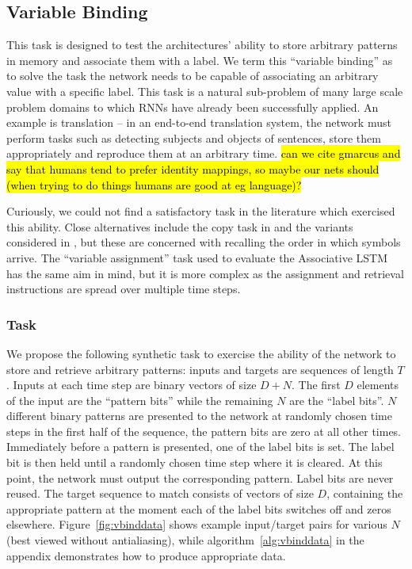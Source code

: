 \subsection{Variable Binding}
This task is designed to test the architectures' ability to store arbitrary patterns in memory and
associate them with a label. We term this ``variable binding'' as to solve the task the network needs
to be capable of associating an arbitrary value with a specific label. This task is a natural
sub-problem of many large scale problem domains to which RNNs have already been successfully applied.
An example is translation -- in an end-to-end translation system, the network must perform tasks such
as detecting subjects and objects of sentences, store them appropriately and reproduce them at an
arbitrary time. \hl{can we cite gmarcus and say that humans tend to prefer identity mappings, so maybe
our nets should (when trying to do things humans are good at eg language)?}

Curiously, we could
not find a satisfactory task in the literature which exercised this ability.
Close alternatives include
the copy task in \autocite{Hochreiter1997} and the variants considered in \autocite{Graves2014}, but these
are concerned with recalling the order in which symbols arrive. The ``variable assignment'' task
used to evaluate the Associative LSTM \autocite{Danihelka2016} has the same aim in mind, but it is more
complex as the assignment and retrieval instructions are spread over multiple time steps.


\subsubsection{Task}
We propose the following synthetic task to exercise the ability of the network to store and retrieve
arbitrary patterns: inputs and targets are sequences of length \(T\). Inputs at each time step are
binary vectors of size \(D+N\). The first \(D\) elements of the input are the ``pattern bits'' while
the remaining \(N\) are the ``label bits''. \(N\) different binary patterns are presented to the
network at randomly chosen time steps in the first half of the sequence, the pattern bits are zero at
all other times. Immediately before a pattern is presented, one of the label bits is set. The label
bit is then held until a randomly chosen time step where it is cleared.
At this point, the network must output the corresponding pattern. Label bits are never reused. The target
sequence to match consists of vectors of size \(D\), containing the appropriate pattern at the moment each
of the label bits switches off and zeros elsewhere. Figure~\ref{fig:vbinddata} shows example input/target
pairs for various \(N\) (best viewed without antialiasing), 
while algorithm~\ref{alg:vbinddata} in the appendix demonstrates how to produce appropriate data.

